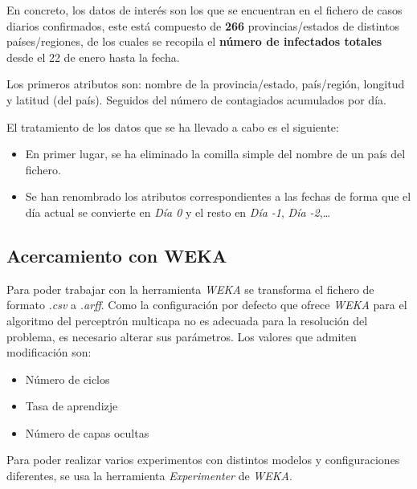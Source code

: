 \documentclass[12pt,a4paper, xcolor=table]{article}
\begin{document}
    En concreto, los datos de interés son los que se encuentran en el fichero de casos diarios confirmados, este está compuesto de \textbf{266} provincias/estados de distintos países/regiones, de los cuales se recopila el \textbf{número de infectados totales} desde el 22 de enero hasta la fecha.

    \vspace{1mm}

    Los primeros atributos son: nombre de la provincia/estado, país/región, longitud y latitud (del país). Seguidos del número de contagiados acumulados por día.

    \vspace{3mm}

    El tratamiento de los datos que se ha llevado a cabo es el siguiente:

    \begin{itemize}
        \item En primer lugar, se ha eliminado la comilla simple del nombre de un país del fichero.
        \item Se han renombrado los atributos correspondientes a las fechas de forma que el día actual se convierte en \textit{Día 0} y el resto en \textit{Día -1}, \textit{Día -2},\dots
    \end{itemize}




    \subsection{Acercamiento con WEKA}

      Para poder trabajar con la herramienta \textit{WEKA} se transforma el fichero de formato \textit{.csv} a \textit{.arff}. Como la configuración por defecto que ofrece \textit{WEKA} para el algoritmo del perceptrón multicapa no es adecuada para la resolución del problema, es necesario alterar sus parámetros. Los valores que admiten modificación son:

      \begin{itemize}
        \item Número de ciclos
        \item Tasa de aprendizje
        \item Número de capas ocultas
      \end{itemize}

      Para poder realizar varios experimentos con distintos modelos y configuraciones diferentes, se usa la herramienta \textit{Experimenter} de \textit{WEKA}.
\end{document}
